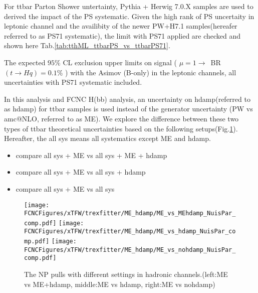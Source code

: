 For ttbar Parton Shower untertainty, Pythia + Herwig 7.0.X samples are used to derived the impact of the PS systematic. Given the high rank of PS uncertaity in leptonic channel and the availibity of the newer PW+H7.1 samples(hereafer referred to as PS71 systematic), the limit with PS71 applied are checked and shown here Tab.\ref{tab:tthML_ttbarPS_vs_ttbarPS71}.




\begin{table}
\caption{The expected $95\%$ CL exclusion upper limits on signal ( $\mu=1\to$~BR$(t\to Hq)=0.1\%$ ) with the Asimov (B-only) in the leptonic channels, all uncertainties with PS71 systematic included.}
\label{tab:tthML_ttbarPS_vs_ttbarPS71}

\end{table}





In this analysis and FCNC H(bb) analysis, an uncertainty on hdamp(referred to as hdamp) for ttbar samples is used instead of the generator uncertainty (PW vs amc@NLO, referred to as ME). We explore the difference between these two types of ttbar theoretical uncertainties based on the following setups(Fig.\ref{fig:xTFW_ME_vs_MEhdamp}). Hereafter, the all sys means all systematics except ME and hdamp. 

\begin{itemize}
	\item compare all sys + ME  vs  all sys + ME + hdamp
	\item compare all sys + ME  vs  all sys + hdamp 
	\item compare all sys + ME  vs  all sys
\end{itemize}

\begin{figure}[H]
\centering
\texttt{[image: \\FCNCFigures/xTFW/trexfitter/ME\_hdamp/ME\_vs\_MEhdamp\_NuisPar\_comp.pdf]}
\texttt{[image: \\FCNCFigures/xTFW/trexfitter/ME\_hdamp/ME\_vs\_hdamp\_NuisPar\_comp.pdf]}
\texttt{[image: \\FCNCFigures/xTFW/trexfitter/ME\_hdamp/ME\_vs\_nohdamp\_NuisPar\_comp.pdf]}
\caption{The NP pulls with different settings in hadronic channels.(left:ME vs ME+hdamp, middle:ME vs hdamp, right:ME vs nohdamp)}
\label{fig:xTFW_ME_vs_MEhdamp}
\end{figure}

		







\newpage

